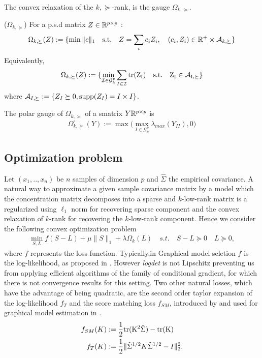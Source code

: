 The convex relaxation of the $k,\succeq$-rank, is the gauge $\Omega_{k,\succeq}$. 

\begin{mydef}
($\Omega_{k,\succeq}$) For a p.s.d  matrix $Z\in\mathbb{R}^{p\times p}$  :
\begin{align}
\Omega_{k,\succeq}(Z):=\{\min \|c\|_1 \quad \text{s.t.} \quad Z=\sum_{i} c_i Z_i, \quad (c_i,Z_i)\in \mathbb{R}^{+}\times\mathcal{A}_{k,\succeq}\}
\end{align}
Equivalently, 
\begin{align}
\Omega_{k,\succeq}(Z):=\{\min_{\mathcal{I}\in\mathcal{G}^p_k} \sum_{I\in\mathcal{I}}\rm tr(Z_I) \quad \text{s.t.} \quad Z_I\in\mathcal{A}_{I,\succeq}\}
\end{align}
where  $\mathcal{A}_{I,\succeq}:=\{Z_I\succeq 0 ,\text{supp}(Z_I)=I\times I\}$.
\end{mydef}

\begin{lemm} The polar gauge of $\Omega_{k,\succeq}$ of a smatrix $Y\mathbb{R}^{p\times p}$ is
\begin{align}
\Omega_{k,\succeq}^{\circ}(Y):= \max\big(\max_{I\in\mathcal{G}^p_k}\lambda_{max}(Y_{II}),0\big)
\end{align}
\end{lemm}

\subsection{Optimization problem}
Let $(x_1,..,x_n)$ be $n$ samples of dimension $p$ and   $\hat{\Sigma}$ the empirical covariance. A natural way to approximate a given sample covariance matrix by a model which the concentration matrix decomposes into a sparse and $k$-low-rank matrix is a regularized using $\ell_1$ norm for recovering sparse component and the convex relaxation of $k$-rank for recovering the $k$-low-rank component. Hence we consider the following convex optimization problem
\begin{align}
\label{opt}
\min_{S,L} f(S-L)+\mu\|S\|_{1}+\lambda\Omega_k(L) \quad s.t. \quad S-L \succeq 0 \quad L \succeq 0,
\end{align}
where  $f$ represents the loss function. Typically,in Graphical model seletion $f$ is the log-likelihood, as proposed in \citet{chandrasekaran2010}. However \textit{logdet} is not Lipschitz preventing us from applying efficient algorithms of the family of conditional gradient, for which there is not convergence results for this setting.  Two other natural losses, which have the advantage of being quadratic, are the second order taylor expansion of the log-likelihood $f_{T}$ and the score matching loss $f_{SM}$, introduced by \citet{hyvarinen2005estimation} and used for graphical model estimation in \citet{lin2016estimation}.
\begin{align}
f_{SM}(K)&:=\frac{1}{2}\rm tr(K^2 \hat{\Sigma})-\rm tr(K) \\
f_{T}(K)&:=\frac{1}{2}\|\hat{\Sigma}^{1/2}K\hat{\Sigma}^{1/2}-I\|_2^2.
\end{align}

